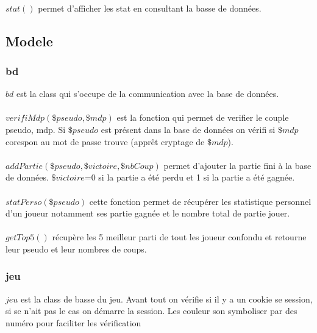 \documentclass{article}
\begin{document}
            \paragraph{}
            $stat()$ permet d'afficher les stat en consultant la basse de données.
        
        
    \subsection{Modele}
        \subsubsection{bd}
            $bd$ est la class qui s'occupe de la communication avec la base de données.
            
            \paragraph{}
            $verifiMdp(\$pseudo, \$mdp)$ est la fonction qui permet de verifier le couple pseudo, mdp. Si $\$pseudo$ est présent dans la  base de données on vérifi si $\$mdp$ corespon au mot de passe trouve (apprêt cryptage de $\$mdp$).
    
            \paragraph{}
            $addPartie(\$pseudo, \$victoire, \$nbCoup)$ permet d'ajouter la partie fini à la base de données. $\$victoire$=0 si la partie a été perdu et 1 si la partie a été gagnée.
            
            \paragraph{}
            $statPerso(\$pseudo)$ cette fonction permet de récupérer les statistique personnel d'un joueur notamment ses partie gagnée et le nombre total de partie jouer.
            
            \paragraph{}
            $getTop5()$ récupère les 5 meilleur parti de tout les joueur confondu et retourne leur pseudo et leur nombres de coups.
            
            
        \subsubsection{jeu}
            $jeu$ est la class de basse du jeu.
            Avant tout on vérifie si il y a un cookie se session, si se n'ait pas le cas on démarre la session.
            Les couleur son symboliser par des numéro pour faciliter les vérification
            
\end{document}
